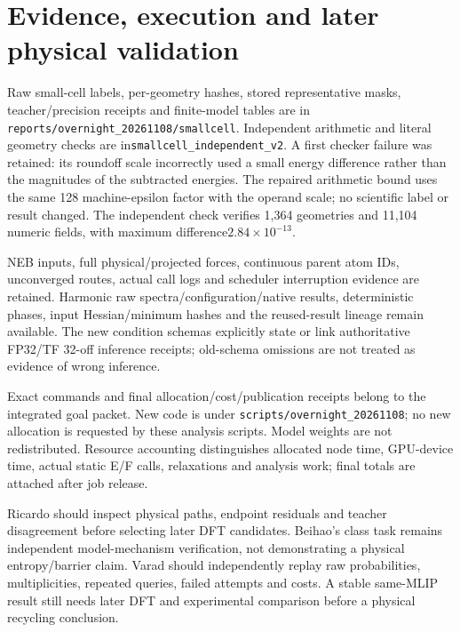 \documentclass[10pt]{article}
\begin{document}
\clearpage\section*{Evidence, execution and later physical validation}
Raw small-cell labels, per-geometry hashes, stored representative masks,
teacher/precision receipts and finite-model tables are in
\texttt{reports/overnight\_20261108/smallcell}. Independent arithmetic and literal
geometry checks are in\texttt{smallcell\_independent\_v2}. A first checker failure
was retained: its roundoff scale incorrectly used a small energy difference
rather than the magnitudes of the subtracted energies. The repaired arithmetic
bound uses the same 128 machine-epsilon factor with the operand scale; no
scientific label or result changed. The independent check verifies 1,364 geometries
and 11,104 numeric fields, with maximum difference$2.84\times 10^{-13}$.

NEB inputs, full physical/projected forces, continuous parent atom IDs,
unconverged routes, actual call logs and scheduler interruption evidence are
retained. Harmonic raw spectra/configuration/native results, deterministic phases,
input Hessian/minimum hashes and the reused-result lineage remain available.
The new condition schemas explicitly state or link authoritative FP32/TF 32-off
inference receipts; old-schema omissions are not treated as evidence of wrong
inference.

Exact commands and final allocation/cost/publication receipts belong to the
integrated goal packet. New code is under
\texttt{scripts/overnight\_20261108}; no new allocation is requested by these
analysis scripts. Model weights are not redistributed. Resource accounting
distinguishes allocated node time, GPU-device time, actual static E/F calls,
relaxations and analysis work; final totals are attached after job release.

Ricardo should inspect physical paths, endpoint residuals and teacher disagreement
before selecting later DFT candidates. Beihao's class task remains independent
model-mechanism verification, not demonstrating a physical entropy/barrier claim.
Varad should independently replay raw probabilities, multiplicities, repeated
queries, failed attempts and costs. A stable same-MLIP result still needs later
DFT and experimental comparison before a physical recycling conclusion.


\end{document}
